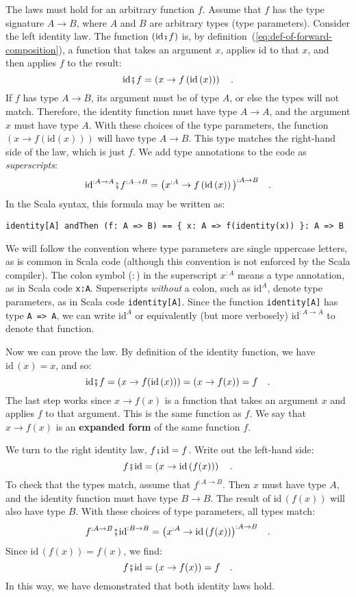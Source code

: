 The laws must hold for an arbitrary function $f$. Assume that $f$
has the type signature $A\rightarrow B$, where $A$ and $B$ are
arbitrary types (type parameters). Consider the left identity law.
The function $(\text{id}\bef f)$ is, by definition~(\ref{eq:def-of-forward-composition}),
a function that takes an argument $x$, applies $\text{id}$ to that
$x$, and then applies $f$ to the result: 
\[
\text{id}\bef f=\left(x\rightarrow f\left(\text{id}\,(x)\right)\right)\quad.
\]
If $f$ has type $A\rightarrow B$, its argument must be of type $A$,
or else the types will not match. Therefore, the identity function
must have type $A\rightarrow A$, and the argument $x$ must have
type $A$. With these choices of the type parameters, the function
$\left(x\rightarrow f(\text{id}(x))\right)$ will have type $A\rightarrow B$.
This type matches the right-hand side of the law, which is just $f$.
We add type annotations to the code as \emph{superscripts}:
\[
\text{id}^{:A\rightarrow A}\bef f^{:A\rightarrow B}=\big(x^{:A}\rightarrow f\left(\text{id}\,(x)\right)\big)^{:A\rightarrow B}\quad.
\]
In the Scala syntax, this formula may be written as:
\begin{lstlisting}
identity[A] andThen (f: A => B) == { x: A => f(identity(x)) }: A => B
\end{lstlisting}

We will follow the convention where type parameters are single uppercase
letters, as is common in Scala code (although this convention is not
enforced by the Scala compiler). The colon symbol ($:$) in the superscript
$x^{:A}$ means a type annotation, as in Scala code \lstinline!x:A!.
Superscripts \emph{without} a colon, such as $\text{id}^{A}$, denote
type parameters, as in Scala code \lstinline!identity[A]!. Since
the function \lstinline!identity[A]! has type \lstinline!A => A!,
we can write $\text{id}^{A}$ or equivalently (but more verbosely)
$\text{id}^{:A\rightarrow A}$ to denote that function.

Now we can prove the law. By definition of the identity function,
we have $\text{id}\,(x)=x$, and so:
\[
\text{id}\bef f=\left(x\rightarrow f(\text{id}\,(x))\right)=\left(x\rightarrow f(x)\right)=f\quad.
\]
The last step works since $x\rightarrow f(x)$ is a function that
takes an argument $x$ and applies $f$ to that argument. This is
the same function as $f$. We say that $x\rightarrow f(x)$ is an
\textbf{expanded form} of the
same function $f$.

We turn to the right identity law, $f\bef\text{id}=f$. Write out
the left-hand side:
\[
f\bef\text{id}=\left(x\rightarrow\text{id}\,(f(x))\right)\quad.
\]
To check that the types match, assume that $f^{:A\rightarrow B}$.
Then $x$ must have type $A$, and the identity function must have
type $B\rightarrow B$. The result of $\text{id}\,(f(x))$ will also
have type $B$. With these choices of type parameters, all types match:
\[
f^{:A\rightarrow B}\bef\text{id}^{:B\rightarrow B}=\big(x^{:A}\rightarrow\text{id}\,(f(x))\big)^{:A\rightarrow B}\quad.
\]
Since $\text{id}\,(f(x))=f(x)$, we find:
\[
f\bef\text{id}=\left(x\rightarrow f(x)\right)=f\quad.
\]
In this way, we have demonstrated that both identity laws hold. 

